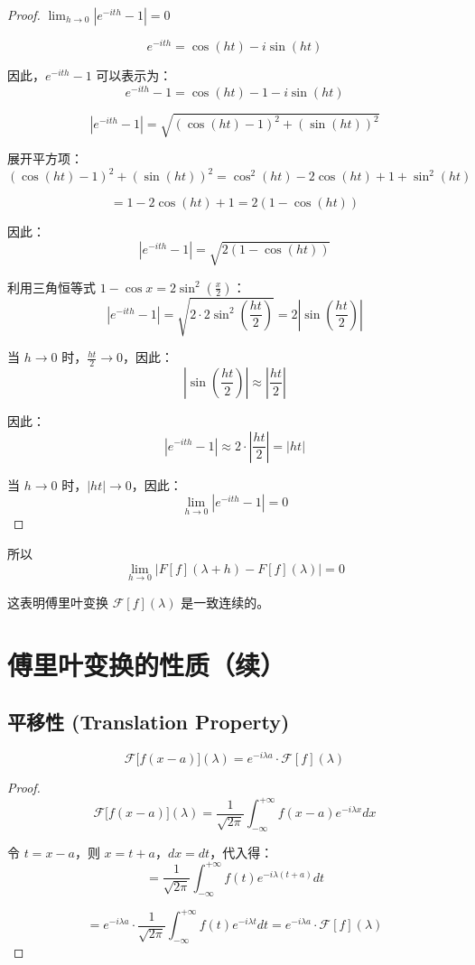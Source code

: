 \documentclass[12pt,a4paper]{article}
\theoremstyle{plain}
\theoremstyle{definition}
\theoremstyle{remark}
\begin{document}
\begin{proof}
	$	\lim_{h \to 0} |e^{-ith} - 1| = 0 $
	
	\[
	e^{-ith} = \cos(ht) - i \sin(ht)
	\]
	
	因此，\(e^{-ith} - 1\) 可以表示为：
	\[
	e^{-ith} - 1 = \cos(ht) - 1 - i \sin(ht)
	\]
	
	\[
	|e^{-ith} - 1| = \sqrt{(\cos(ht) - 1)^2 + (\sin(ht))^2}
	\]
	
	展开平方项：
	\[
	(\cos(ht) - 1)^2 + (\sin(ht))^2 = \cos^2(ht) - 2 \cos(ht) + 1 + \sin^2(ht)
	\]
	
	\[
	= 1 - 2 \cos(ht) + 1 = 2(1 - \cos(ht))
	\]
	
	因此：
	\[
	|e^{-ith} - 1| = \sqrt{2(1 - \cos(ht))}
	\]
	
利用三角恒等式 \(1 - \cos x = 2 \sin^2\left(\frac{x}{2}\right)\)：
\[
|e^{-ith} - 1| = \sqrt{2 \cdot 2 \sin^2\left(\frac{ht}{2}\right)} = 2 \left|\sin\left(\frac{ht}{2}\right)\right|
\]

当 \(h \to 0\) 时，\(\frac{ht}{2} \to 0\)，因此：
\[
\left|\sin\left(\frac{ht}{2}\right)\right| \approx \left|\frac{ht}{2}\right|
\]

因此：
\[
|e^{-ith} - 1| \approx 2 \cdot \left|\frac{ht}{2}\right| = |ht|
\]

当 \(h \to 0\) 时，\(|ht| \to 0\)，因此：
\[
\lim_{h \to 0} |e^{-ith} - 1| = 0
\]
	
\end{proof}
	
	所以
	\[
	\lim_{h \to 0} |F[f](\lambda + h) - F[f](\lambda)| = 0
	\]
	
	这表明傅里叶变换 \(\mathcal{F}[f](\lambda)\) 是一致连续的。
	
	\section{傅里叶变换的性质（续）}
	
	\subsection{平移性 (Translation Property)}
	\[
	\mathcal{F}\big[f(x-a)\big](\lambda) = e^{-i\lambda a} \cdot \mathcal{F}[f](\lambda)
	\]
	\begin{proof}
		
		\[
		\mathcal{F}\big[f(x-a)\big](\lambda) = \frac{1}{\sqrt{2\pi}} \int_{-\infty}^{+\infty} f(x-a) e^{-i\lambda x} dx
		\]
		
		令 $t = x - a$，则 $x = t + a$，$dx = dt$，代入得：
		\[
		= \frac{1}{\sqrt{2\pi}} \int_{-\infty}^{+\infty} f(t) e^{-i\lambda (t+a)} dt
		\]
		
		\[
		= e^{-i\lambda a} \cdot \frac{1}{\sqrt{2\pi}} \int_{-\infty}^{+\infty} f(t) e^{-i\lambda t} dt = e^{-i\lambda a} \cdot \mathcal{F}[f](\lambda)
		\]
	\end{proof}
	
\end{document}
